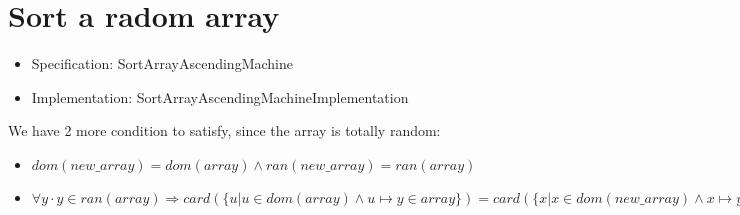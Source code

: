 \section{Sort a radom array}

\begin{itemize}
\item Specification: SortArrayAscendingMachine
\item Implementation: SortArrayAscendingMachineImplementation
\end{itemize}

We have 2 more condition to satisfy, since the array is totally random: 
\begin{itemize}
\item $dom(new\_array) = dom(array) \land ran(new\_array) = ran(array)$
\item $\forall y \cdot y \in ran(array) \Rightarrow card(\{u | u \in dom(array) \land u \mapsto y \in array\}) = card(\{x | x \in dom(new\_array) \land x \mapsto y \in new_array\})$
\end{itemize}

